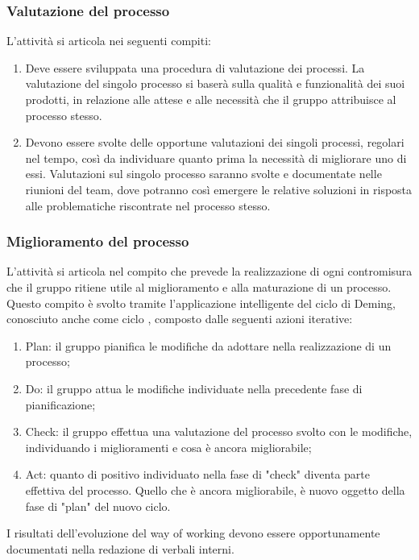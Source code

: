 \subsubsection{Valutazione del processo}
L'attività si articola nei seguenti compiti:
\begin{enumerate}
    \item Deve essere sviluppata una procedura di valutazione dei processi. La valutazione del singolo processo si baserà sulla qualità e funzionalità dei suoi prodotti, in relazione alle attese e alle necessità che il gruppo attribuisce al processo stesso.
    \item Devono essere svolte delle opportune valutazioni dei singoli processi, regolari nel tempo, così da individuare quanto prima la necessità di migliorare uno di essi. Valutazioni sul singolo processo saranno svolte e documentate nelle riunioni del team, dove potranno così emergere le relative soluzioni in risposta alle problematiche riscontrate nel processo stesso.
\end{enumerate}

\subsubsection{Miglioramento del processo}
L'attività si articola nel compito che prevede la realizzazione di ogni contromisura che il gruppo ritiene utile al miglioramento e alla maturazione di un processo. Questo compito è svolto tramite l'applicazione intelligente del ciclo di Deming, conosciuto anche come ciclo , composto dalle seguenti azioni iterative:
\begin{enumerate}
    \item Plan: il gruppo pianifica le modifiche da adottare nella realizzazione di un processo;
    \item Do: il gruppo attua le modifiche individuate nella precedente fase di pianificazione;
    \item Check: il gruppo effettua una valutazione del processo svolto con le modifiche, individuando i miglioramenti e cosa è ancora migliorabile;
    \item Act: quanto di positivo individuato nella fase di "check" diventa parte effettiva del processo. Quello che è ancora migliorabile, è nuovo oggetto della fase di "plan" del nuovo ciclo.
\end{enumerate}
I risultati dell'evoluzione del way of working devono essere opportunamente documentati nella redazione di verbali interni.

